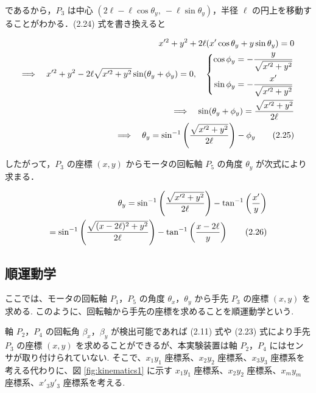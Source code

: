     であるから，$P_3$ は中心 $(2\ell - \ell \cos\theta_y,\ -\ell \sin\theta_y)$，半径 $\ell$ の円上を移動することがわかる．(2.24) 式を書き換えると
    
    \begin{align}
        x'^2 + y^2 + 2\ell (x'\cos\theta_y + y\sin\theta_y) = 0 \notag \\
        \Longrightarrow \quad
        x'^2 + y^2 - 2\ell \sqrt{x'^2 + y^2} \sin(\theta_y + \phi_y) = 0,
        \quad
        \left\{
        \begin{aligned}
        \cos\phi_y &= -\dfrac{y}{\sqrt{x'^2 + y^2}} \\
        \sin\phi_y &= -\dfrac{x'}{\sqrt{x'^2 + y^2}}
        \end{aligned}
        \right.
        \notag \\
        \Longrightarrow \quad
        \sin(\theta_y + \phi_y) = \dfrac{\sqrt{x'^2 + y^2}}{2\ell} \notag \\
        \Longrightarrow \quad
        \theta_y = \sin^{-1}\left( \dfrac{\sqrt{x'^2 + y^2}}{2\ell} \right) - \phi_y
        \tag{2.25}
        \end{align}
        
    
    したがって，$P_3$ の座標 $(x, y)$ からモータの回転軸 $P_5$ の角度 $\theta_y$ が次式により求まる．
    
    \begin{align}
    \theta_y
    = \sin^{-1} \left( \dfrac{\sqrt{x'^2 + y^2}}{2\ell} \right)
    - \tan^{-1} \left( \dfrac{x'}{y} \right) \notag \\
    = \sin^{-1} \left( \dfrac{\sqrt{(x - 2\ell)^2 + y^2}}{2\ell} \right)
    - \tan^{-1} \left( \dfrac{x - 2\ell}{y} \right)
    \tag{2.26}
    \end{align}
    

    \subsection{順運動学}

    ここでは、モータの回転軸 $P_1$，$P_5$ の角度 $\theta_x$，$\theta_y$ から手先 $P_3$ の座標 $(x, y)$ を求める.
    このように、回転軸から手先の座標を求めることを順運動学という.
    
    \par
    軸 $P_2$，$P_4$ の回転角 $\beta_x$，$\beta_y$ が検出可能であれば (2.11) 式や (2.23) 式により手先 $P_3$ の座標 $(x, y)$ を求めることができるが、本実験装置は軸 $P_2$，$P_4$ にはセンサが取り付けられていない.
    そこで、$x_1 y_1$ 座標系、$x_2 y_2$ 座標系、$x_3 y_3$ 座標系を考える代わりに、図 \ref{fig:kinematics1} に示す
    $x_1 y_1$ 座標系、$x_2 y_2$ 座標系、$x_m y_m$ 座標系、$x'_3 y'_3$ 座標系を考える.
    
